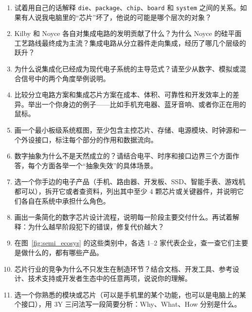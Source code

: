 \documentclass[11pt,a4paper]{article}
\begin{document}
\begin{enumerate}
  \item 试着用自己的话解释 \texttt{die}、\texttt{package}、\texttt{chip}、\texttt{board} 和 \texttt{system} 之间的关系。如果有人说我电脑里的``芯片''坏了，他说的可能是哪个层次的对象？
  \item Kilby 和 Noyce 各自对集成电路的发明贡献了什么？为什么 Noyce 的硅平面工艺路线最终成为主流？集成电路从分立器件走向集成，经历了哪几个层级的跃升？
  \item 为什么说集成化已经成为现代电子系统的主导范式？请至少从数字、模拟或混合信号中的两个角度举例说明。
  \item 比较分立电路方案和集成芯片方案在成本、体积、可靠性和开发效率上的差异。举出一个你身边的例子——比如手机充电器、蓝牙音响、或者你正在用的鼠标。
  \item 画一个最小板级系统框图，至少包含主控芯片、存储、电源模块、时钟源和一个外设接口，标注每个部分的作用和数据流向。
  \item 数字抽象为什么不是天然成立的？请结合电平、时序和接口边界三个方面作答，每个方面各举一个``抽象失效''的具体场景。
  \item 选一个你手边的电子产品（手机、路由器、开发板、SSD、智能手表、游戏机都可以），拆开它或者查资料，列出其中至少 4 颗芯片或关键器件，并说明它们各自在系统中承担什么角色。
  \item 画出一条简化的数字芯片设计流程，说明每一阶段主要交付什么。再试着解释：为什么越早阶段犯下的错误，修复代价越大？
  \item 在图~\ref{fig:semi_ecosys} 的这些类别中，各选 1--2 家代表企业，查一查它们主要是做什么的，都有哪些产品。
  \item 芯片行业的竞争为什么不只发生在制造环节？结合文档、开发工具、参考设计、技术支持或开发者生态中的任意两项，说说你的理解。
  \item 选一个你熟悉的模块或芯片（可以是手机里的某个功能，也可以是电脑上的某个接口），用 3Y 三问法写一段简要分析：Why、What、How 分别是什么。
\end{enumerate}
\end{document}
